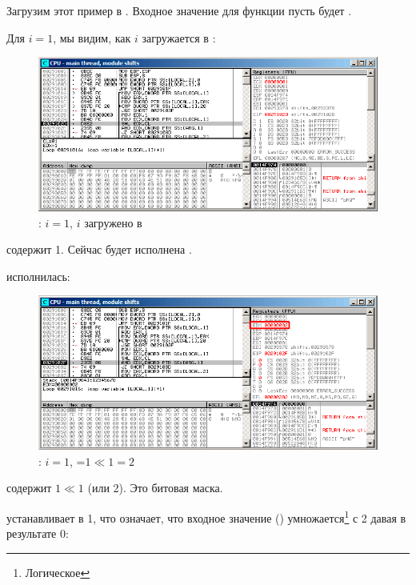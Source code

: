 ﻿\clearpage
\myparagraph{\olly}
\myindex{\olly}

Загрузим этот пример в \olly. 
Входное значение для функции пусть будет .

Для $i=1$, мы видим, как $i$ загружается в \ECX: 

\begin{figure}[H]
\centering
\includegraphics[scale=\FigScale]{patterns/14_bitfields/4_popcnt/olly1_1.png}
\caption{\olly: $i=1$, $i$ загружено в \ECX}
\label{fig:shifts_olly1_1}
\end{figure}

\EDX содержит 1. Сейчас будет исполнена \SHL.

\clearpage
\SHL исполнилась:

\begin{figure}[H]
\centering
\includegraphics[scale=\FigScale]{patterns/14_bitfields/4_popcnt/olly1_2.png}
\caption{\olly: $i=1$, \EDX=$1 \ll 1=2$}
\label{fig:shifts_olly1_2}
\end{figure}

\EDX содержит $1 \ll 1$ (или 2). Это битовая маска.

\clearpage
\AND устанавливает \ZF в 1, 
что означает, что входное значение () 
умножается\footnote{Логическое } с 2 давая в результате 0:

